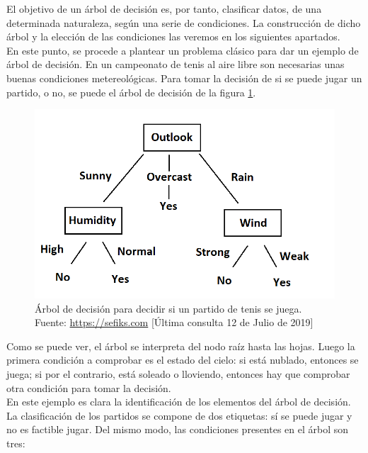 			El objetivo de un \'arbol de decisi\'on es, por tanto, clasificar datos, de una determinada naturaleza, seg\'un una serie de condiciones. La construcci\'on de dicho \'arbol y la elecci\'on de las condiciones las veremos en los siguientes apartados.\\
		
			En este punto, se procede a plantear un problema cl\'asico para dar un ejemplo de \'arbol de decisi\'on. En un campeonato de tenis al aire libre son necesarias unas buenas condiciones metereol\'ogicas. Para tomar la decisi\'on de si se puede jugar un partido, o no, se puede el \'arbol de decisi\'on de la figura \ref{fig:tenis}.
			
			\begin{figure}[H]
    			\centering
    			\includegraphics[scale=0.5]{imagenes/tree.png}
    			\caption[\'Arbol de decisi\'on para jugar partido de tenis.]{\'Arbol de decisi\'on para decidir si un partido de tenis se juega.\\ Fuente: \url{https://sefiks.com} [\'Ultima consulta 12 de Julio de 2019]}
    			\label{fig:tenis}
		    \end{figure}
			
			Como se puede ver, el \'arbol se interpreta del nodo ra\'iz hasta las hojas. Luego la primera condici\'on a comprobar es el estado del cielo: si est\'a nublado, entonces se juega; si por el contrario, est\'a soleado o lloviendo, entonces hay que comprobar otra condici\'on para tomar la decisi\'on.\\
			
			En este ejemplo es clara la identificaci\'on de los elementos del \'arbol de decisi\'on. La clasificaci\'on de los partidos se compone de dos etiquetas: s\'i se puede jugar y no es factible jugar. Del mismo modo, las condiciones presentes en el \'arbol son tres:
			
